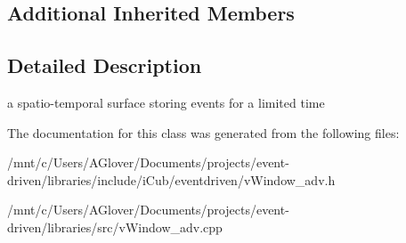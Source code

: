 \subsection*{Additional Inherited Members}


\subsection{Detailed Description}
a spatio-\/temporal surface storing events for a limited time 

The documentation for this class was generated from the following files\+:\begin{DoxyCompactItemize}
\item 
/mnt/c/\+Users/\+A\+Glover/\+Documents/projects/event-\/driven/libraries/include/i\+Cub/eventdriven/v\+Window\+\_\+adv.\+h\item 
/mnt/c/\+Users/\+A\+Glover/\+Documents/projects/event-\/driven/libraries/src/v\+Window\+\_\+adv.\+cpp\end{DoxyCompactItemize}
